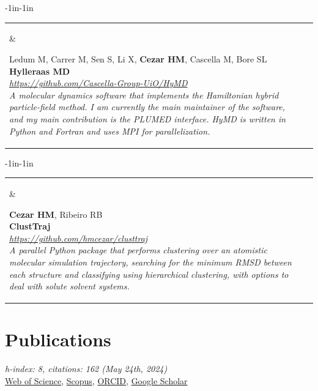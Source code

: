 \documentclass[10pt]{article}
\newcommand{\newsoftware}[3]{
\begin{adjustwidth}{-1in}{-1in}  
\begin{tabular}{p{0.9in}p{7in}}
\parbox[c]{0.9in}{} & \parbox[c]{6in}{\setstretch{0.9} {\scriptsize {#1}} \\ {\bf #2}  \\ {\footnotesize\emph {#3}}}
\end{tabular}
\end{adjustwidth}
\vspace{0.2in}
}
\begin{document}
\newsoftware{Ledum M, Carrer M, Sen S, Li X, \textbf{Cezar HM}, Cascella M, Bore SL}{Hylleraas MD}{\href{https://github.com/Cascella-Group-UiO/HyMD}{https://github.com/Cascella-Group-UiO/HyMD} \\ 
A molecular dynamics software that implements the Hamiltonian hybrid particle-field method. I am currently the main maintainer of the software, and my main contribution is the PLUMED interface. HyMD is written in Python and Fortran and uses MPI for parallelization.}

\newsoftware{\textbf{Cezar HM}, Ribeiro RB}{ClustTraj}{\href{https://github.com/hmcezar/clusttraj}{https://github.com/hmcezar/clusttraj} \\ 
A parallel Python package that performs clustering over an atomistic molecular simulation trajectory, searching for the minimum RMSD between each structure and classifying using hierarchical clustering, with options to deal with solute solvent systems.}





\section*{Publications}


\textit{h-index: 8, citations: 162 (May 24th, 2024)} \\
\href{https://www.webofscience.com/wos/author/record/445303}{Web of Science}, 
\href{https://www.scopus.com/authid/detail.uri?authorId=57188802591}{Scopus},
\href{https://orcid.org/0000-0002-7553-0482}{ORCID}, 
\href{https://scholar.google.com.br/citations?hl=pt-BR&user=LtBk3gEAAAAJ}{Google Scholar} 
\end{document}
